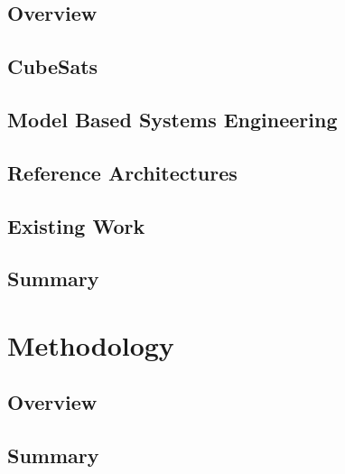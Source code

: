 \documentclass[12pt,letterpaper,oneside]{book}
\begin{document}
        \section{Overview}
        \label{LitOver}
   		
        
        \section{CubeSats}
        \label{CubeSats}
   		
   		
   	    \section{Model Based Systems Engineering}
        \label{MBSE}
   		

   	    \section{Reference Architectures}
        \label{RefArch}
   		

   		\section{Existing Work}
        \label{Existing_Work}
   		
   		
        \section{Summary}
        \label{Ch2Sum}
   		
        
    \chapter{Methodology}
    \label{Methodology}

    	\section{Overview}
        \label{MethOverveiw}
        
        
        \section{Summary}
        \label{Ch3Sum}
   		
        
\end{document}
